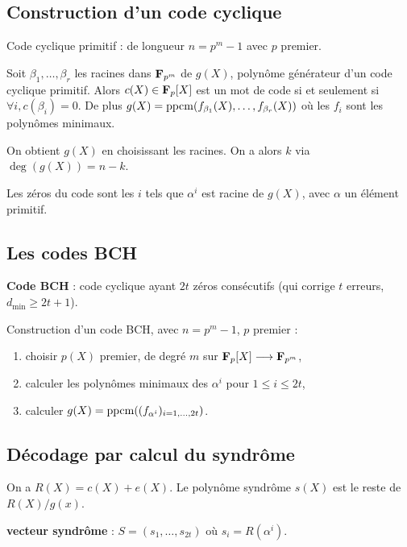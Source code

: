 \subsection{Construction d'un code cyclique}

	Code cyclique primitif : de longueur $n = p^m - 1$ avec $p$ premier.
	
	\begin{thm}
		Soit $\beta_1,\ldots,\beta_r$ les racines dans $\mathbf{F}_{p^m}$ de $g(X)$, polynôme générateur d'un code cyclique primitif.
		Alors $c(X) \in \mathbf{F}_p[X]$ est un mot de code si et seulement si $\forall i, c(\beta_i) = 0$.
		De plus $g(X) = \operatorname{ppcm}(f_{\beta_1}(X),\ldots,f_{\beta_r}(X))$ où les $f_i$ sont les polynômes minimaux.
	\end{thm}

	On obtient $g(X)$ en choisissant les racines.
	On a alors $k$ via $\deg(g(X)) = n - k$.
	
	Les zéros du code sont les $i$ tels que $\alpha^i$ est racine de $g(X)$, avec $\alpha$ un élément primitif.


\subsection{Les codes BCH}

	\begin{defn}
		\textbf{Code BCH} : code cyclique ayant $2t$ zéros consécutifs (qui corrige $t$ erreurs, $d_{\min} \geq 2t + 1$).
	\end{defn}
	
	Construction d'un code BCH, avec $n = p^m - 1$, $p$ premier :
	\begin{enumerate}[1)]
		\item choisir $p(X)$ premier, de degré $m$ sur $\mathbf{F}_p[X] \longrightarrow \mathbf{F}_{p^m}$,
		\item calculer les polynômes minimaux des $\alpha^i$ pour $1 \leq i \leq 2t$,
		\item calculer $g(X) = \operatorname{ppcm}((f_{\alpha^i})_{i = 1,\ldots,2t})$.
	\end{enumerate}


\subsection{Décodage par calcul du syndrôme}

	On a $R(X) = c(X) + e(X)$.
	Le polynôme syndrôme $s(X)$ est le reste de $R(X)/g(x)$.
	
	\begin{defn}
		\textbf{vecteur syndrôme} : $S = (s_1,\ldots,s_{2t})$ où $s_i = R(\alpha^i)$.
	\end{defn}


